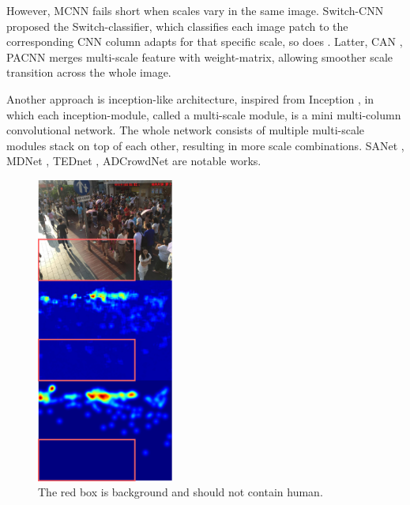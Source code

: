 However, MCNN fails short when scales vary in the same image. Switch-CNN \cite{sam2017switching} proposed the Switch-classifier, which classifies each image patch to the corresponding CNN column adapts for that specific scale, so does \cite{8965799}. Latter, CAN \cite{liu2019context}, PACNN \cite{shi2019revisiting} merges multi-scale feature with weight-matrix, allowing smoother scale transition across the whole image. 

Another approach is inception-like architecture, inspired from Inception \cite{szegedy2015going}, in which each inception-module, called a multi-scale module, is a mini multi-column convolutional network. The whole network consists of multiple multi-scale modules stack on top of each other, resulting in more scale combinations. SANet \cite{cao2018scale}, MDNet \cite{wang2019multi}, TEDnet \cite{jiang2019crowd}, ADCrowdNet \cite{liu2019adcrowdnet} are notable works. 


\begin{figure}[htbp]
\centerline{\includegraphics[width=0.4\textwidth]{Picture/problem/background_noise_shb.png}}
\caption{The red box is background and should not contain human.}
\label{fig:noise}
\end{figure}

